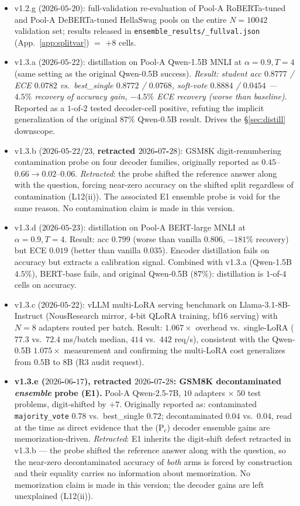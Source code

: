 \documentclass[11pt]{article}
\begin{document}
\begin{itemize}[leftmargin=*]
\item v1.2.g ($2026$-$05$-$20$): full-validation re-evaluation of Pool-A RoBERTa-tuned and Pool-A DeBERTa-tuned HellaSwag pools on the entire $N{=}10042$ validation set; results released in \texttt{ensemble\_\allowbreak results/\allowbreak *\_\allowbreak fullval.\allowbreak json} (App.~\ref{app:splitvar}) $=$ $+8$ cells.
\item v1.3.a ($2026$-$05$-$22$): distillation on Pool-A Qwen-1.5B MNLI at $\alpha{=}0.9, T{=}4$ (same setting as the original Qwen-0.5B success). \emph{Result: student acc $0.8777$ / ECE $0.0782$ vs.\ best\_single $0.8772$ / $0.0768$, soft-vote $0.8884$ / $0.0454$ — $4.5\%$ recovery of accuracy gain, $-4.5\%$ ECE recovery (worse than baseline)}. Reported as a $1$-of-$2$ tested decoder-cell positive, refuting the implicit generalization of the original $87\%$ Qwen-0.5B result. Drives the \S\ref{sec:distill} downscope.
\item v1.3.b ($2026$-$05$-$22$/$23$, \textbf{retracted $2026$-$07$-$28$}): GSM8K digit-renumbering contamination probe on four decoder families, originally reported as $0.45$--$0.66\to0.02$--$0.06$. \emph{Retracted}: the probe shifted the reference answer along with the question, forcing near-zero accuracy on the shifted split regardless of contamination (L12(ii)). The associated E1 ensemble probe is void for the same reason. No contamination claim is made in this version.
\item v1.3.d ($2026$-$05$-$23$): distillation on Pool-A BERT-large MNLI at $\alpha{=}0.9, T{=}4$. Result: acc $0.799$ (worse than vanilla $0.806$, $-181\%$ recovery) but ECE $0.019$ (better than vanilla $0.035$). Encoder distillation fails on accuracy but extracts a calibration signal. Combined with v1.3.a (Qwen-1.5B $4.5\%$), BERT-base fails, and original Qwen-0.5B ($87\%$): distillation is $1$-of-$4$ cells on accuracy.
\item v1.3.c ($2026$-$05$-$22$): vLLM multi-LoRA serving benchmark on Llama-3.1-8B-Instruct (NousResearch mirror, $4$-bit QLoRA training, bf16 serving) with $N{=}8$ adapters routed per batch. Result: $1.067{\times}$ overhead vs.\ single-LoRA ($77.3$ vs.\ $72.4$ ms/batch median, $414$ vs.\ $442$ req/s), consistent with the Qwen-0.5B $1.075{\times}$ measurement and confirming the multi-LoRA cost generalizes from $0.5$B to $8$B (R3 audit request).
\item \textbf{v1.3.e ($2026$-$06$-$17$), \textbf{retracted $2026$-$07$-$28$}: GSM8K decontaminated \emph{ensemble} probe (E1).} Pool-A Qwen-2.5-7B, $10$ adapters $\times$ $50$ test problems, digit-shifted by $+7$. Originally reported as: contaminated \texttt{majority\_vote} $0.78$ vs.\ best\_single $0.72$; decontaminated $0.04$ vs.\ $0.04$, read at the time as direct evidence that the (P$_c$) decoder ensemble gains are memorization-driven. \emph{Retracted}: E1 inherits the digit-shift defect retracted in v1.3.b --- the probe shifted the reference answer along with the question, so the near-zero decontaminated accuracy of \emph{both} arms is forced by construction and their equality carries no information about memorization. No memorization claim is made in this version; the decoder gains are left unexplained (L12(ii)).

\end{itemize}
\end{document}
